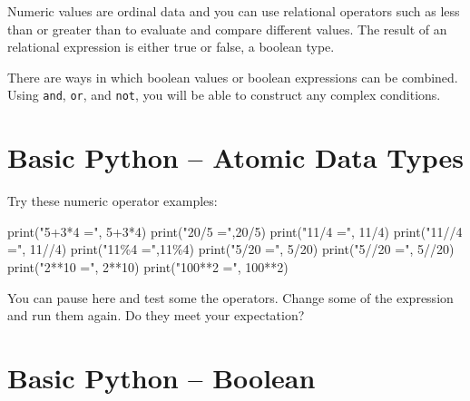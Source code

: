 \documentclass[
  letterpaper,
]{scrbook}
\newenvironment{Shaded}{\begin{snugshade}}{\end{snugshade}}
\newcommand{\BuiltInTok}[1]{\textcolor[rgb]{0.00,0.23,0.31}{#1}}
\newcommand{\DecValTok}[1]{\textcolor[rgb]{0.68,0.00,0.00}{#1}}
\newcommand{\NormalTok}[1]{\textcolor[rgb]{0.00,0.23,0.31}{#1}}
\newcommand{\OperatorTok}[1]{\textcolor[rgb]{0.37,0.37,0.37}{#1}}
\newcommand{\StringTok}[1]{\textcolor[rgb]{0.13,0.47,0.30}{#1}}
\begin{document}
Numeric values are ordinal data and you can use relational operators
such as less than or greater than to evaluate and compare different
values. The result of an relational expression is either true or false,
a boolean type.

There are ways in which boolean values or boolean expressions can be
combined. Using \texttt{and}, \texttt{or}, and \texttt{not}, you will be
able to construct any complex conditions.

\section*{Basic Python -- Atomic Data
Types}\label{basic-python-atomic-data-types-2}


Try these numeric operator examples:

\begin{Shaded}
\begin{Highlighting}[]
\BuiltInTok{print}\NormalTok{(}\StringTok{"5+3*4 ="}\NormalTok{, }\DecValTok{5}\OperatorTok{+}\DecValTok{3}\OperatorTok{*}\DecValTok{4}\NormalTok{)}
\BuiltInTok{print}\NormalTok{(}\StringTok{"20/5 ="}\NormalTok{,}\DecValTok{20}\OperatorTok{/}\DecValTok{5}\NormalTok{)}
\BuiltInTok{print}\NormalTok{(}\StringTok{"11/4 ="}\NormalTok{, }\DecValTok{11}\OperatorTok{/}\DecValTok{4}\NormalTok{)}
\BuiltInTok{print}\NormalTok{(}\StringTok{"11//4 ="}\NormalTok{, }\DecValTok{11}\OperatorTok{//}\DecValTok{4}\NormalTok{)}
\BuiltInTok{print}\NormalTok{(}\StringTok{"11\%4 ="}\NormalTok{,}\DecValTok{11}\OperatorTok{\%}\DecValTok{4}\NormalTok{)}
\BuiltInTok{print}\NormalTok{(}\StringTok{"5/20 ="}\NormalTok{, }\DecValTok{5}\OperatorTok{/}\DecValTok{20}\NormalTok{)}
\BuiltInTok{print}\NormalTok{(}\StringTok{"5//20 ="}\NormalTok{, }\DecValTok{5}\OperatorTok{//}\DecValTok{20}\NormalTok{)}
\BuiltInTok{print}\NormalTok{(}\StringTok{"2**10 ="}\NormalTok{, }\DecValTok{2}\OperatorTok{**}\DecValTok{10}\NormalTok{)}
\BuiltInTok{print}\NormalTok{(}\StringTok{"100**2 ="}\NormalTok{, }\DecValTok{100}\OperatorTok{**}\DecValTok{2}\NormalTok{)}
\end{Highlighting}
\end{Shaded}

You can pause here and test some the operators. Change some of the
expression and run them again. Do they meet your expectation?

\section*{Basic Python -- Boolean}\label{basic-python-boolean}
\end{document}
